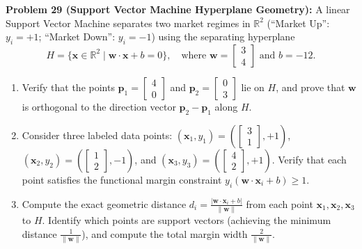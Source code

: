 \documentclass[11pt, letterpaper]{article}
\theoremstyle{definition}
\theoremstyle{remark}
\begin{document}
\textbf{Problem 29 (Support Vector Machine Hyperplane Geometry):} A linear Support Vector Machine separates two market regimes in $\mathbb{R}^2$ (``Market Up'': $y_i = +1$; ``Market Down'': $y_i = -1$) using the separating hyperplane
\[
H = \{\mathbf{x} \in \mathbb{R}^2 \mid \mathbf{w} \cdot \mathbf{x} + b = 0\}, \quad \text{where } \mathbf{w} = \begin{bmatrix} 3 \\ 4 \end{bmatrix} \text{ and } b = -12.
\]
\begin{enumerate}[label=(\alph*)]
    \item Verify that the points $\mathbf{p}_1 = \begin{bmatrix} 4 \\ 0 \end{bmatrix}$ and $\mathbf{p}_2 = \begin{bmatrix} 0 \\ 3 \end{bmatrix}$ lie on $H$, and prove that $\mathbf{w}$ is orthogonal to the direction vector $\mathbf{p}_2 - \mathbf{p}_1$ along $H$.
    \item Consider three labeled data points: $(\mathbf{x}_1, y_1) = \left(\begin{bmatrix} 3 \\ 1 \end{bmatrix}, +1\right)$, $(\mathbf{x}_2, y_2) = \left(\begin{bmatrix} 1 \\ 2 \end{bmatrix}, -1\right)$, and $(\mathbf{x}_3, y_3) = \left(\begin{bmatrix} 4 \\ 2 \end{bmatrix}, +1\right)$. Verify that each point satisfies the functional margin constraint $y_i(\mathbf{w} \cdot \mathbf{x}_i + b) \ge 1$.
    \item Compute the exact geometric distance $d_i = \frac{|\mathbf{w}\cdot\mathbf{x}_i + b|}{\|\mathbf{w}\|}$ from each point $\mathbf{x}_1, \mathbf{x}_2, \mathbf{x}_3$ to $H$. Identify which points are support vectors (achieving the minimum distance $\frac{1}{\|\mathbf{w}\|}$), and compute the total margin width $\frac{2}{\|\mathbf{w}\|}$.
\end{enumerate}
\end{document}
